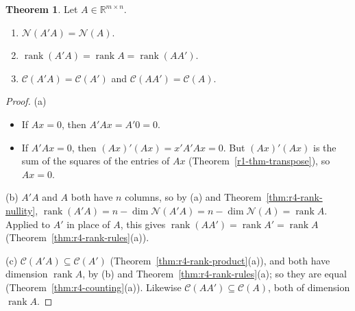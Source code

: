 \documentclass[12pt]{article}
\newcommand{\R}{\mathbb R}
\DeclareMathOperator{\rank}{rank}
\theoremstyle{definition}
\newtheorem{theorem}{Theorem}
\begin{document}
\begin{theorem}\label{thm:r4-rank-ata}
Let \(A\in\R^{m\times n}\).
\begin{enumerate}
\item \(\mathcal N(A'A)=\mathcal N(A)\).
\item \(\rank(A'A)=\rank A=\rank(AA')\).
\item \(\mathcal C(A'A)=\mathcal C(A')\) and \(\mathcal C(AA')=\mathcal C(A)\).
\end{enumerate}
\end{theorem}
\begin{proof}
(a)
\begin{itemize}
\item If \(Ax=0\), then \(A'Ax=A'0=0\).
\item If \(A'Ax=0\), then \((Ax)'(Ax)=x'A'Ax=0\). But \((Ax)'(Ax)\) is the sum of the squares of
the entries of \(Ax\) (Theorem~\ref{r1-thm-transpose}), so \(Ax=0\).
\end{itemize}
(b) \(A'A\) and \(A\) both have \(n\) columns, so by (a) and Theorem~\ref{thm:r4-rank-nullity},
\(\rank(A'A)=n-\dim\mathcal N(A'A)=n-\dim\mathcal N(A)=\rank A\). Applied to \(A'\) in place of
\(A\), this gives \(\rank(AA')=\rank A'=\rank A\) (Theorem~\ref{thm:r4-rank-rules}(a)).

(c) \(\mathcal C(A'A)\subseteq\mathcal C(A')\) (Theorem~\ref{thm:r4-rank-product}(a)), and both have
dimension \(\rank A\), by (b) and Theorem~\ref{thm:r4-rank-rules}(a); so they are equal
(Theorem~\ref{thm:r4-counting}(a)). Likewise \(\mathcal C(AA')\subseteq\mathcal C(A)\), both of
dimension \(\rank A\).
\end{proof}
\end{document}
